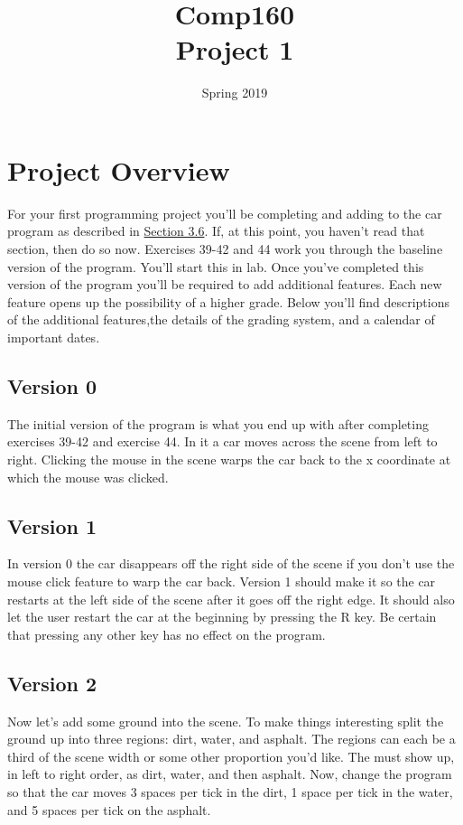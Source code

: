 \documentclass[10pt]{article}
\title{Comp160 \\ Project 1 }
\author{}
\date{ Spring 2019 }
\begin{document}
\maketitle

\section*{Project Overview}

For your first programming project you'll be completing and adding to the car program as described in \href{https://htdp.org/2018-01-06/Book/part_one.html#%28part._.D.K._sec~3adesign-world%29}{Section 3.6}.  If, at this point, you haven't read that section, then do so now. Exercises 39-42 and 44 work you through the baseline version of the program. You'll start this in lab. Once you've completed this version of the program you'll be required to add additional features. Each new feature opens up the possibility of a higher grade. Below you'll find descriptions of the additional features,the details of the grading system, and a calendar of important dates.

\subsection*{Version 0}

The initial version of the program is what you end up with after completing exercises 39-42 and exercise 44. In it a car moves across the scene from left to right. Clicking the mouse in the scene warps the car back to the x coordinate at which the mouse was clicked.

\subsection*{Version 1}

In version 0 the car disappears off the right side of the scene if you don't use the mouse click feature to warp the car back. Version 1 should make it so the car restarts at the left side of the scene after it goes off the right edge. It should also let the user restart the car at the beginning by pressing the R key. Be certain that pressing any other key has no effect on the program.

\subsection*{Version 2}

Now let's add some ground into the scene. To make things interesting split the ground up into three regions: dirt, water, and asphalt. The regions can each be a third of the scene width or some other proportion you'd like. The must show up, in left to right order, as dirt, water, and then asphalt. Now, change the program so that the car moves 3 spaces per tick in the dirt, 1 space per tick in the water, and 5 spaces per tick on the asphalt.
\end{document}
